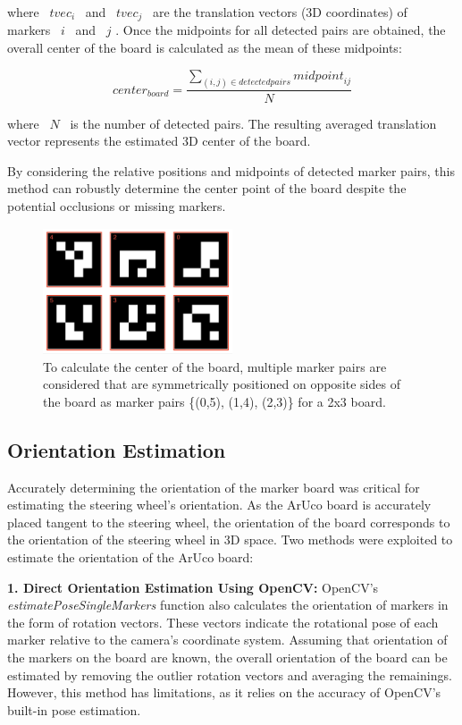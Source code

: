 where  \(tvec_i\)  and  \(tvec_j\)  are the translation vectors 
(3D coordinates) of markers  \(i\)  and  \(j\) . Once the midpoints for 
all detected pairs are obtained, the overall center of the board is 
calculated as the mean of these midpoints:

\[
{center}_{board} = \frac{\sum_{(i, j) \in {detected pairs}} {midpoint}_{ij}}{N}
\]

where  \(N\)  is the number of detected pairs. The resulting averaged 
translation vector represents the estimated 3D center of the board. 


By considering the relative positions and midpoints of detected marker 
pairs, this method can robustly determine the center point of the board despite the potential occlusions or missing markers.

\begin{figure}[htpb]
    \centering
    \includegraphics[width=0.5\textwidth]{media/chapter 5/aruco_board_ids.png}
    \caption{To calculate the center of the board, multiple 
    marker pairs are considered that are symmetrically positioned on opposite sides of the board as marker pairs \{(0,5), (1,4), (2,3)\} for a 2x3 board.}
    \label{fig:marker_ids}
\end{figure}


\subsection{Orientation Estimation}
Accurately determining the orientation of the marker board was 
critical for estimating the steering wheel’s orientation. 
As the ArUco board is accurately placed tangent to the steering 
wheel, the orientation of the board corresponds to the 
orientation of the steering wheel in 3D space. 
Two methods were exploited to estimate the orientation of 
the ArUco board: 

\textbf{1. Direct Orientation Estimation Using OpenCV: }
OpenCV’s \emph{estimatePoseSingleMarkers} function also calculates the 
orientation of markers in the form of rotation vectors. 
These vectors indicate the rotational pose of each marker 
relative to the camera’s coordinate system. Assuming that orientation of the markers on the board are known, the overall orientation of the board
can be estimated by removing the outlier rotation vectors and averaging the remainings. However, this method has limitations, as it relies on the 
accuracy of OpenCV's built-in pose estimation.

